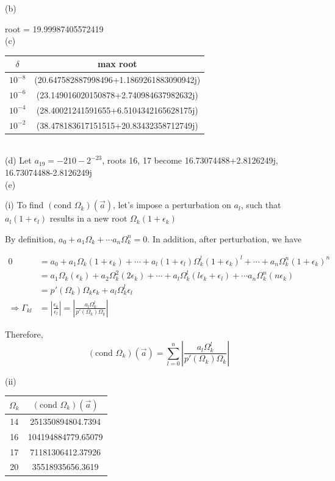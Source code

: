 \documentclass[10pt]{article}
\begin{document}
(b)

root = 19.99987405572419\\

(c)

\begin{tabular}{cc}
	\hline
$\delta$ & max root\\
\hline
$10^{-8}$ & (20.647582887998496+1.1869261883090942j)\\
$10^{-6}$ & (23.149016020150878+2.740984637982632j)\\
$10^{-4}$ & (28.40021241591655+6.5104342165628175j)\\
$10^{-2}$ & (38.478183617151515+20.83432358712749j)\\
\hline
\end{tabular}\\

(d) Let $a_{19}=-210-2^{-23}$, roots 16, 17 become 16.73074488+2.8126249j, 16.73074488-2.8126249j\\


(e)

(i) To find $(\text{cond } \Omega_k)(\vec{a})$, let's impose a perturbation on $a_l$, such that $a_l(1+\epsilon_l)$ results in a new root $\Omega_k(1+\epsilon_k)$

By definition, $a_0+a_1\Omega_k+\cdots a_n\Omega_k^n=0$. In addition, after perturbation, we have

\begin{align*}
0&=a_0+a_1\Omega_k(1+\epsilon_k)+\cdots +a_l(1+\epsilon_l)\Omega_k^l(1+\epsilon_k)^l+\cdots + a_n\Omega_k^n(1+\epsilon_k)^n\\
& = a_1\Omega_k(\epsilon_k)+a_2\Omega_k^2(2\epsilon_k) +\cdots +a_l\Omega_k^l(l\epsilon_k+\epsilon_l)+\cdots a_n\Omega_k^n(n\epsilon_k)\\
&=p'(\Omega_k)\Omega_k\epsilon_k+a_l\Omega_k^l\epsilon_l\\
\Rightarrow \Gamma_{kl}&=|\frac{\epsilon_k}{\epsilon_l}|=|\frac{a_l\Omega_k^l}{p'(\Omega_k)\Omega_k}|
\end{align*}

Therefore,
$$
(\text{cond } \Omega_k)(\vec{a})=\sum_{l=0}^{n}|\frac{a_l\Omega_k^l}{p'(\Omega_k)\Omega_k}|
$$

(ii)

\begin{tabular}{cc}
\hline
$\Omega_k$ & $(\text{cond } \Omega_k)(\vec{a})$\\
\hline
14 & 251350894804.7394\\
16 & 104194884779.65079\\
17 & 71181306412.37926\\
20 & 35518935656.3619\\
\hline
\end{tabular}\\
\end{document}
